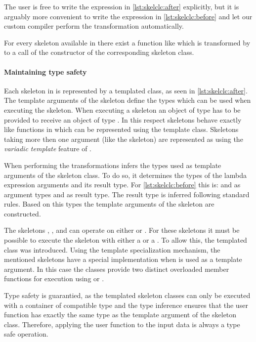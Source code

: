 The user is free to write the expression in \autoref{lst:skelclc:after} explicitly, but it is arguably more convenient to write the expression in \autoref{lst:skelclc:before} and let our custom compiler perform the transformation automatically.

For every skeleton available in \SkelCL there exist a function like  which is transformed by  to a call of the constructor of the corresponding skeleton class.

\paragraph{Maintaining type safety}
Each skeleton in \SkelCL is represented by a templated class, as seen in \autoref{lst:skelclc:after}.
The template arguments of the skeleton define the types which can be used when executing the skeleton.
When executing a skeleton  an object of type  has to be provided to receive an object of type .
In this respect skeletons behave exactly like functions in \Cpp which can be represented using the  template class.
Skeletons taking more then one argument (like the  skeleton) are represented as  using the \emph{variadic template} feature of \Cpp.

When performing the transformations  infers the types used as template arguments of the skeleton class.
To do so, it determines the types of the lambda expression arguments and its result type.
For \autoref{lst:skelclc:before} this is:  and  as argument types and  as result type.
The result type is inferred following standard \Cpp rules.
Based on this types the template arguments of the skeleton are constructed.

The skeletons \map, \zip, and \stencil can operate on either  or .
For these skeletons it must be possible to execute the skeleton with either a  or a .
To allow this, the templated class  was introduced.
Using the template specialization mechanism, the mentioned skeletons have a special implementation when  is used as a template argument.
In this case the classes provide two distinct overloaded member functions for execution using  or .

Type safety is guarantied, as the templated skeleton classes can only be executed with a container of compatible type and the type inference ensures that the user function has exactly the same type as the template argument of the skeleton class.
Therefore, applying the user function to the input data is always a type safe operation.


